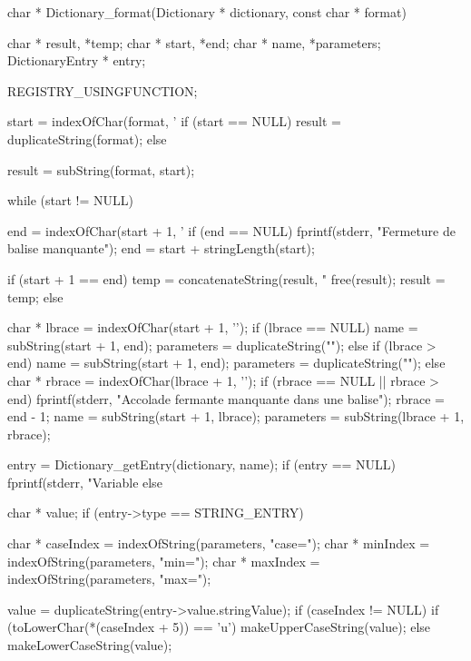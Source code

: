 \begin{csourcecorrection}
char * Dictionary_format(Dictionary * dictionary, const char * format) {
    char * result, *temp;
    char * start, *end;
    char * name, *parameters;
    DictionaryEntry * entry;

    REGISTRY_USINGFUNCTION;

    start = indexOfChar(format, '%
    if (start == NULL) {
        result = duplicateString(format);
    } else {
        result = subString(format, start);

        while (start != NULL) {
            end = indexOfChar(start + 1, '%
            if (end == NULL) {
                fprintf(stderr, "Fermeture de balise manquante\n");
                end = start + stringLength(start);
            }

            if (start + 1 == end) {
                temp = concatenateString(result, "%
                free(result);
                result = temp;
            } else {
                char * lbrace = indexOfChar(start + 1, '{');
                if (lbrace == NULL) {
                    name = subString(start + 1, end);
                    parameters = duplicateString("");
                } else if (lbrace > end) {
                    name = subString(start + 1, end);
                    parameters = duplicateString("");
                } else {
                    char * rbrace = indexOfChar(lbrace + 1, '}');
                    if (rbrace == NULL || rbrace > end) {
                        fprintf(stderr, "Accolade fermante manquante dans une balise\n");
                        rbrace = end - 1;
                    }
                    name = subString(start + 1, lbrace);
                    parameters = subString(lbrace + 1, rbrace);
                }

                entry = Dictionary_getEntry(dictionary, name);
                if (entry == NULL) {
                    fprintf(stderr, "Variable %
                } else {
                    char * value;
                    if (entry->type == STRING_ENTRY) {
                        char * caseIndex = indexOfString(parameters, "case=");
                        char * minIndex = indexOfString(parameters, "min=");
                        char * maxIndex = indexOfString(parameters, "max=");

                        value = duplicateString(entry->value.stringValue);
                        if (caseIndex != NULL) {
                            if (toLowerChar(*(caseIndex + 5)) == 'u')
                                makeUpperCaseString(value);
                            else
                                makeLowerCaseString(value);
                        }

}}}}}}
\end{csourcecorrection}
